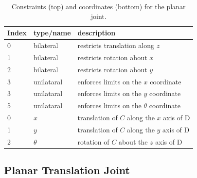 \begin{table}[h]
\centering
\begin{tabular}{|l|l|l|}
\hline
Index & type/name & description \\
\hline
0 & bilateral & restricts translation along $z$ \\
1 & bilateral & restricts rotation about $x$ \\
2 & bilateral & restricts rotation about $y$ \\
3 & unilataral & enforces limits on the $x$ coordinate \\
3 & unilataral & enforces limits on the $y$ coordinate \\
5 & unilataral & enforces limits on the $\theta$ coordinate \\
\hline
\hline
0 & $x$ & translation of $C$ along the $x$ axis of D \\
1 & $y$ & translation of $C$ along the $y$ axis of D \\
2 & $\theta$ & rotation of $C$ about the $z$ axis of D\\
\hline
\end{tabular}
\caption{Constraints (top) and coordinates (bottom) for the planar joint.}
\label{PlanarConstraints:tbl}
\end{table}

\subsection{Planar Translation Joint}

